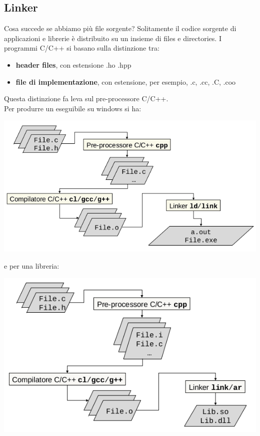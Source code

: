 \documentclass[a4paper,12pt, oneside]{book}
\begin{document}
	\subsection{Linker}
	Cosa succede se abbiamo più file sorgente? Solitamente il codice sorgente di applicazioni e librerie è distribuito su un insieme di files e directories. I programmi C/C++ si basano sulla distinzione tra:
	\begin{itemize}
		\item \textbf{header files}, con estensione .ho .hpp
		\item \textbf{file di implementazione}, con estensione, per esempio, .c, .cc, .C, .coo
	\end{itemize}
	Questa distinzione fa leva sul pre-processore C/C++.\\
	Per produrre un eseguibile su windows si ha:
	\begin{center}
		\includegraphics[scale=2.5]{img/c4.png}
	\end{center}
	e per una libreria:
	\begin{center}
		\includegraphics[scale=2.5]{img/c5.png}
	\end{center}
\end{document}
